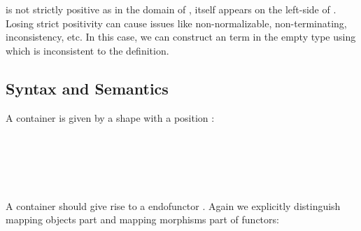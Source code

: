 is not strictly positive as in the domain of ,  itself appears on the left-side of . Losing strict positivity can cause issues like non-normalizable, non-terminating, inconsistency, etc. In this case, we can construct an term in the empty type using  which is inconsistent to the definition.

\subsection{Syntax and Semantics}

A container is given by a shape  \AgdaSymbol{:}  with a position  \AgdaSymbol{:}   :

\begin{code}%
\>[0]\AgdaSpace{}%
\AgdaSpace{}%
\AgdaSymbol{:}\AgdaSpace{}%
\AgdaSpace{}%
\<%
\\
\>[0][@{}l@{\AgdaIndent{0}}]%
\>[2]\AgdaSpace{}%
\<%
\\
%
\>[2]\<%
\\
\>[2][@{}l@{\AgdaIndent{0}}]%
\>[4]\AgdaSpace{}%
\AgdaSymbol{:}\AgdaSpace{}%
\<%
\\
%
\>[4]\AgdaSpace{}%
\AgdaSymbol{:}\AgdaSpace{}%
\AgdaSpace{}%
\AgdaSpace{}%
\<%
\end{code}

\begin{code}[hide]%
\>[0]\AgdaSpace{}%
\AgdaSpace{}%
\AgdaSpace{}%
\AgdaSymbol{:}\AgdaSpace{}%
\<%
\end{code}

A container should give rise to a endofunctor   . Again we explicitly distinguish mapping objects part and mapping morphisms part of functors:

